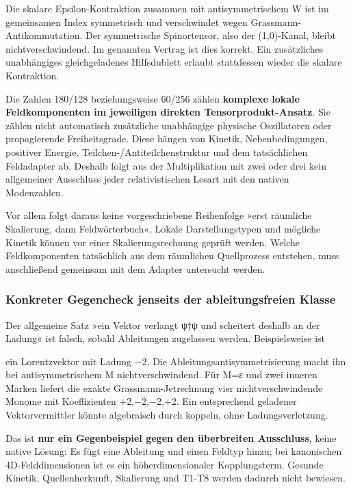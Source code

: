 Die skalare Epsilon-Kontraktion zusammen mit antisymmetrischem W ist im
gemeinsamen Index symmetrisch und verschwindet wegen
Grassmann-Antikommutation. Der symmetrische Spinortensor, also der
(1,0)-Kanal, bleibt nichtverschwindend. Im genannten Vertrag ist dies
korrekt. Ein zusätzliches unabhängiges gleichgeladenes Hilfsdublett
erlaubt stattdessen wieder die skalare Kontraktion.

Die Zahlen 180/128 beziehungsweise 60/256 zählen \textbf{komplexe lokale
Feldkomponenten im jeweiligen direkten Tensorprodukt-Ansatz}. Sie zählen
nicht automatisch zusätzliche unabhängige physische Oszillatoren oder
propagierende Freiheitsgrade. Diese hängen von Kinetik,
Nebenbedingungen, positiver Energie, Teilchen-/Antiteilchenstruktur und
dem tatsächlichen Feldadapter ab. Deshalb folgt aus der Multiplikation
mit zwei oder drei kein allgemeiner Ausschluss jeder relativistischen
Lesart mit den nativen Modenzahlen.

Vor allem folgt daraus keine vorgeschriebene Reihenfolge »erst räumliche
Skalierung, dann Feldwörterbuch«. Lokale Darstellungstypen und mögliche
Kinetik können vor einer Skalierungsrechnung geprüft werden. Welche
Feldkomponenten tatsächlich aus dem räumlichen Quellprozess entstehen,
muss anschließend gemeinsam mit dem Adapter untersucht werden.

\subsubsection{Konkreter Gegencheck jenseits der ableitungsfreien
Klasse}\label{konkreter-gegencheck-jenseits-der-ableitungsfreien-klasse}

Der allgemeine Satz »ein Vektor verlangt ψ†ψ und scheitert deshalb an
der Ladung« ist falsch, sobald Ableitungen zugelassen werden.
Beispielsweise ist


ein Lorentzvektor mit Ladung −2. Die Ableitungsantisymmetrisierung macht
ihn bei antisymmetrischem M nichtverschwindend. Für M=ε und zwei inneren
Marken liefert die exakte Grassmann-Jetrechnung vier nichtverschwindende
Monome mit Koeffizienten +2,−2,−2,+2. Ein entsprechend geladener
Vektorvermittler könnte algebraisch durch
 koppeln, ohne
Ladungsverletzung.

Das ist \textbf{nur ein Gegenbeispiel gegen den überbreiten Ausschluss},
keine native Lösung: Es fügt eine Ableitung und einen Feldtyp hinzu; bei
kanonischen 4D-Felddimensionen ist es ein höherdimensionaler
Kopplungsterm. Gesunde Kinetik, Quellenherkunft, Skalierung und T1-T8
werden dadurch nicht bewiesen.

